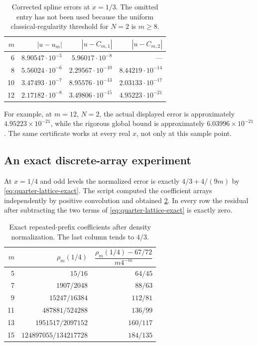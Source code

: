 \documentclass[11pt,a4paper]{article}
\numberwithin{equation}{section}
\theoremstyle{definition}
\begin{document}
\begin{table}[htbp]
\centering
\renewcommand{\arraystretch}{1.2}
\begin{tabular}{rrrr}
\toprule
$m$ & $|u-u_m|$ & $|u-C_{m,1}|$ & $|u-C_{m,2}|$\\
\midrule
6 & $8.90547\cdot10^{-5}$ & $5.96017\cdot10^{-8}$ & ---\\
8 & $5.56024\cdot10^{-6}$ & $2.29567\cdot10^{-10}$ & $8.44219\cdot10^{-14}$\\
10 & $3.47493\cdot10^{-7}$ & $8.95576\cdot10^{-13}$ & $2.03133\cdot10^{-17}$\\
12 & $2.17182\cdot10^{-8}$ & $3.49806\cdot10^{-15}$ & $4.95223\cdot10^{-21}$\\
\bottomrule
\end{tabular}
\caption{Corrected spline errors at $x=1/3$. The omitted entry has
not been used because the uniform classical-regularity threshold
for $N=2$ is $m\geq8$.}\label{tab:corrections}
\end{table}

For example, at $m=12$, $N=2$, the actual displayed error is
approximately $4.95223\times10^{-21}$, while the rigorous global
bound is approximately $6.03996\times10^{-21}$. The same certificate
works at every real $x$, not only at this sample point.

\subsection{An exact discrete-array experiment}

At $x=1/4$ and odd levels the normalized error is exactly
$4/3+4/(9m)$ by \eqref{eq:quarter-lattice-exact}. The script
computed the coefficient arrays independently by positive
convolution and obtained \cref{tab:lattice}. In every row the
residual after subtracting the two terms of
\eqref{eq:quarter-lattice-exact} is exactly zero.

\begin{table}[htbp]
\centering
\renewcommand{\arraystretch}{1.25}
\begin{tabular}{rrr}
\toprule
$m$ & $\rho_m(1/4)$ & $\dfrac{\rho_m(1/4)-67/72}{m4^{-m}}$\\[4pt]
\midrule
5 & $15/16$ & $64/45$\\
7 & $1907/2048$ & $88/63$\\
9 & $15247/16384$ & $112/81$\\
11 & $487881/524288$ & $136/99$\\
13 & $1951517/2097152$ & $160/117$\\
15 & $124897055/134217728$ & $184/135$\\
\bottomrule
\end{tabular}
\caption{Exact repeated-prefix coefficients after density
normalization. The last column tends to $4/3$.}\label{tab:lattice}
\end{table}
\end{document}
